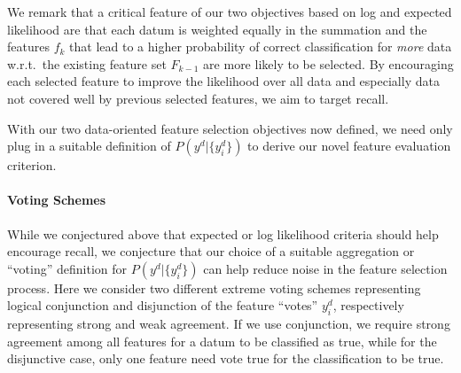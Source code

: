 
We remark that a critical feature of our two objectives based on log
and expected likelihood are that each datum is weighted equally in the
summation and the features $f_k$ that lead to a higher probability of
correct classification for \emph{more} data w.r.t.\ the existing
feature set $F_{k-1}$ are more likely to be selected.  By encouraging
each selected feature to improve the likelihood over all data and
especially data not covered well by previous selected features, we aim
to target recall.

With our two data-oriented feature selection objectives now defined,
we need only plug in a suitable definition of $P(y^d|\{y^d_i\})$ to
derive our novel feature evaluation criterion.  


\paragraph{Voting Schemes}

While we conjectured
above that expected or log likelihood criteria should help encourage
recall, we conjecture that our choice of a suitable aggregation or
``voting'' definition for $P(y^d|\{y^d_i\})$ can help reduce noise in
the feature selection process.
Here we consider two different extreme voting schemes
representing logical conjunction and disjunction of the feature
``votes'' $y^d_i$, respectively representing strong and weak
agreement.  If we use conjunction, we require strong agreement among
all features for a datum to be classified as true, while for the
disjunctive case, only one feature need vote true for the
classification to be true.  

